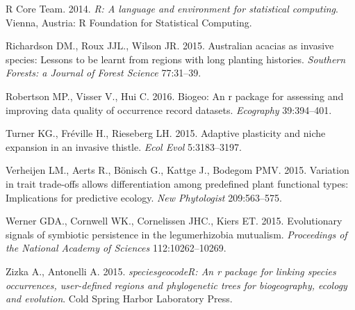 \documentclass[author-year, review, 11pt]{components/elsarticle} %
\begin{document}
R Core Team. 2014. \emph{R: A language and environment for statistical
computing}. Vienna, Austria: R Foundation for Statistical Computing.

Richardson DM., Roux JJL., Wilson JR. 2015. Australian acacias as
invasive species: Lessons to be learnt from regions with long planting
histories. \emph{Southern Forests: a Journal of Forest Science}
77:31--39.

Robertson MP., Visser V., Hui C. 2016. Biogeo: An r package for
assessing and improving data quality of occurrence record datasets.
\emph{Ecography} 39:394--401.

Turner KG., Fr{é}ville H., Rieseberg LH. 2015. Adaptive plasticity and
niche expansion in an invasive thistle. \emph{Ecol Evol} 5:3183--3197.

Verheijen LM., Aerts R., Bönisch G., Kattge J., Bodegom PMV. 2015.
Variation in trait trade-offs allows differentiation among predefined
plant functional types: Implications for predictive ecology. \emph{New
Phytologist} 209:563--575.

Werner GDA., Cornwell WK., Cornelissen JHC., Kiers ET. 2015.
Evolutionary signals of symbiotic persistence in the legumerhizobia
mutualism. \emph{Proceedings of the National Academy of Sciences}
112:10262--10269.

Zizka A., Antonelli A. 2015. \emph{speciesgeocodeR: An r package for
linking species occurrences, user-defined regions and phylogenetic trees
for biogeography, ecology and evolution}. Cold Spring Harbor Laboratory
Press.
\end{document}
